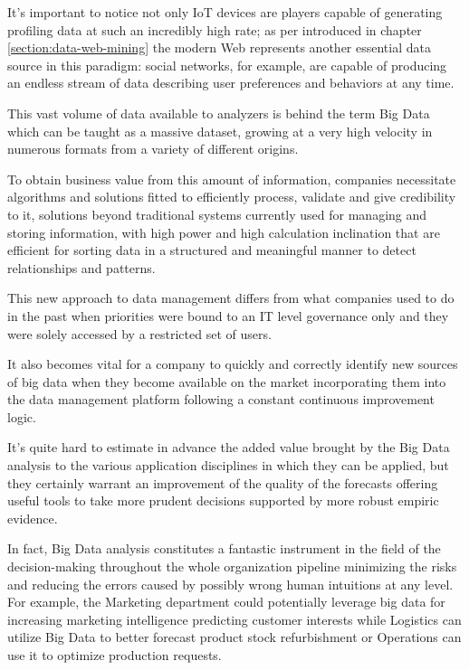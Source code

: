 It's important to notice not only IoT devices are players capable of generating profiling data at such an incredibly high rate;  as per introduced in chapter \ref{section:data-web-mining} the modern Web represents another essential data source in this paradigm: social networks, for example, are capable of producing an endless stream of data describing user preferences and behaviors at any time.

This vast volume of data available to analyzers is behind the term Big Data which can be taught as a massive dataset, growing at a very high velocity in numerous formats from a variety of different origins.

To obtain business value from this amount of information, companies necessitate algorithms and solutions fitted to efficiently process, validate and give credibility to it, solutions beyond traditional systems currently used for managing and storing information, with high power and high calculation inclination that are efficient for sorting data in a structured and meaningful manner to detect relationships and patterns.

This new approach to data management differs from what companies used to do in the past when priorities were bound to an IT level governance only and they were solely accessed by a restricted set of users. 

It also becomes vital for a company to quickly and correctly identify new sources of big data when they become available on the market incorporating them into the data management platform following a constant continuous improvement logic.

It's quite hard to estimate in advance the added value brought by the Big Data analysis to the various application disciplines in which they can be applied, but they certainly warrant an improvement of the quality of the forecasts offering useful tools to take more prudent decisions supported by more robust empiric evidence.

In fact, Big Data analysis constitutes a fantastic instrument in the field of the decision-making throughout the whole organization pipeline minimizing the risks and reducing the errors caused by possibly wrong human intuitions at any level. For example, the Marketing department could potentially leverage big data for increasing marketing intelligence predicting customer interests while Logistics can utilize Big Data to better forecast product stock refurbishment or Operations can use it to optimize production requests.

